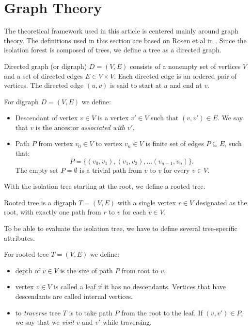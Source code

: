 \section{Graph Theory}
\label{sec:graph_theory}

The theoretical framework used in this article is centered mainly around graph theory.
The definitions used in this section are based on Rosen et.al in \cite{rosen2012discrete}. Since the isolation forest is composed of trees, we define a tree as a directed graph.

\begin{definition}
Directed graph (or digraph) $D = (V, E)$ consists of a nonempty set of vertices $V$ and a set of directed edges $E \in V \times V$. Each directed edge is an ordered pair of vertices.
The directed edge $(u, v)$ is said to start at $u$ and end at $v$.
\end{definition}


\begin{definition}
For digraph $D = (V,E)$ we define:
\begin{itemize}
    \item Descendant of vertex $v \in V$ is a vertex $v' \in V$ such that $(v,v') \in E$. We say that $v$ is the ancestor \emph{associated with} $v'$.
    \item Path $P$ from vertex $v_0 \in V$ to vertex $v_n \in V$ is finite set of edges $P \subseteq E$, such that: $$P = \{(v_0, v_1),(v_1, v_2),\dots(v_{n-1}, v_n)\}.$$
      The empty set $P = \emptyset$ is a trivial path from $v$ to $v$ for every $v \in V$.
    
\end{itemize}
\end{definition}

With the isolation tree starting at the root, we define a rooted tree.

\begin{definition}
Rooted tree is a digraph $T = (V,E)$ with a single vertex $r \in V$ designated as the root, with exactly one path from $r$ to $v$ for each $v \in V$.
\end{definition}

To be able to evaluate the isolation tree, we have to define several tree-specific attributes.

\begin{definition}
For rooted tree $T = (V,E)$ we define:
\begin{itemize}
    \item depth of $v \in V$ is the size of path $P$ from root to $v$.
    \item vertex $v \in V$ is called a leaf if it has no descendants. Vertices that have descendants are called internal vertices.
    \item to \textit{traverse} tree $T$ is to take path $P$ from the root to the leaf. If $(v,v') \in P$, we say that we \emph{visit} $v$ and $v'$ while traversing.
\end{itemize}
\end{definition}
